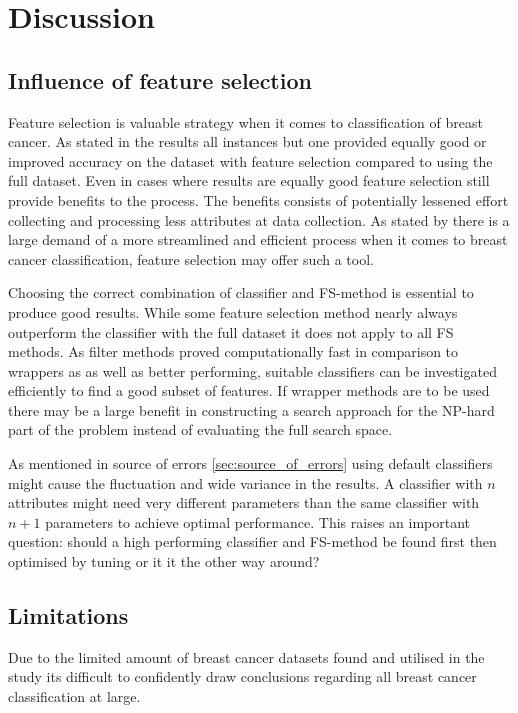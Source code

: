 \chapter{Discussion}

\section{Influence of feature selection}

Feature selection is valuable strategy when it comes to classification of breast cancer. As stated in the results all instances but one provided equally good or improved accuracy on the dataset with feature selection compared to using the full dataset. Even in cases where results are equally good feature selection still provide benefits to the process. The benefits consists of potentially lessened effort collecting and processing less attributes at data collection. As stated by \textcite{martei2018} there is a large demand of a more streamlined and efficient process when it comes to breast cancer classification, feature selection may offer such a tool.

Choosing the correct combination of classifier and FS-method is essential to produce good results. While some feature selection method nearly always outperform the classifier with the full dataset it does not apply to all FS methods. As filter methods proved computationally fast in comparison to wrappers as as well as better performing, suitable classifiers can be investigated efficiently to find a good subset of features. If wrapper methods are to be used there may be a large benefit in constructing a search approach for the NP-hard part of the problem instead of evaluating the full search space.

As mentioned in source of errors \ref{sec:source_of_errors} using default classifiers might cause the fluctuation and wide variance in the results. A classifier with $n$ attributes might need very different parameters than the same classifier with $n + 1$ parameters to achieve optimal performance. This raises an important question: should a high performing classifier and FS-method be found first then optimised by tuning or it it the other way around?


\section{Limitations}

Due to the limited amount of breast cancer datasets found and utilised in the study its difficult to confidently draw conclusions regarding all breast cancer classification at large.

